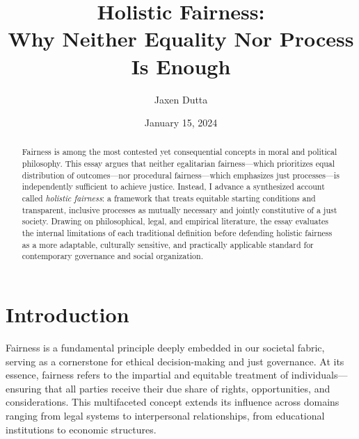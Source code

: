 \documentclass[11pt]{../shared/essay/essay}
\begin{document}
\title{Holistic Fairness:\\
Why Neither Equality Nor Process Is Enough}

\author{Jaxen Dutta}

\date{January 15, 2024}

\begin{abstract}
Fairness is among the most contested yet consequential concepts in moral and political
philosophy. This essay argues that neither egalitarian fairness---which prioritizes equal
distribution of outcomes---nor procedural fairness---which emphasizes just processes---is
independently sufficient to achieve justice. Instead, I advance a synthesized account called
\textit{holistic fairness}: a framework that treats equitable starting conditions and transparent,
inclusive processes as mutually necessary and jointly constitutive of a just society. Drawing on
philosophical, legal, and empirical literature, the essay evaluates the internal limitations of each
traditional definition before defending holistic fairness as a more adaptable, culturally sensitive,
and practically applicable standard for contemporary governance and social organization.
\end{abstract}


\maketitle

\section{Introduction}

Fairness is a fundamental principle deeply embedded in our societal fabric, serving as a
cornerstone for ethical decision-making and just governance. At its essence, fairness refers to
the impartial and equitable treatment of individuals---ensuring that all parties receive their due
share of rights, opportunities, and considerations. This multifaceted concept extends its
influence across domains ranging from legal systems to interpersonal relationships, from
educational institutions to economic structures.
\end{document}
